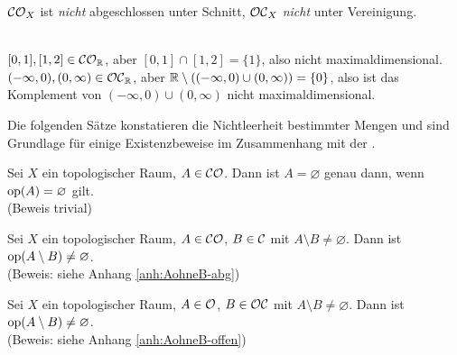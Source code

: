     \begin{bem}
    $\mathcal{CO}_X$ ist \textit{nicht} abgeschlossen unter Schnitt, $\mathcal{OC}_X$ \textit{nicht} unter Vereinigung.
    \end{bem}

    \begin{gegenbsp}\ \\
    ${[0,1], [1,2] \in \mathcal{CO}_{\mathbb{R}}}$, aber ${[0,1] \cap [1,2] = \{1\}}$, also nicht maximaldimensional.\\
    ${(-\infty,0), (0,\infty) \in \mathcal{OC}_{\mathbb{R}}}$, aber ${\mathbb{R} \setminus ((-\infty,0) \cup (0,\infty)) = \{0\}}$, also ist das Komplement von ${(-\infty,0) \cup (0,\infty)}$ nicht maximaldimensional.
    \end{gegenbsp}



    Die folgenden Sätze konstatieren die Nichtleerheit bestimmter Mengen und sind Grundlage für einige Existenzbeweise im Zusammenhang mit der \strukt.

    \begin{satz}\label{satz:Aleer}
        Sei $X$ ein topologischer Raum, $A \in \mathcal{CO}$. Dann ist $A = \varnothing$ genau dann, wenn $\text{op}(A) = \varnothing$ gilt.\\
        (Beweis trivial)
    \end{satz}


    \begin{satz}\label{satz:AohneB-abg}
        Sei $X$ ein topologischer Raum, $A \in \mathcal{CO}$, $B \in \mathcal{C}$ mit $A \setminus B \neq \varnothing$. Dann ist $\text{op}(A \setminus B) \neq \varnothing$.\\
        (Beweis: siehe Anhang \ref{anh:AohneB-abg})
    \end{satz}
    
    
    \begin{satz}\label{satz:AohneB-offen}
        Sei $X$ ein topologischer Raum, $A \in \mathcal{O}$, $B \in \mathcal{OC}$ mit $A \setminus B \neq \varnothing$. Dann ist $\text{op}(A \setminus B) \neq \varnothing$.\\
        (Beweis: siehe Anhang \ref{anh:AohneB-offen})
    \end{satz}

